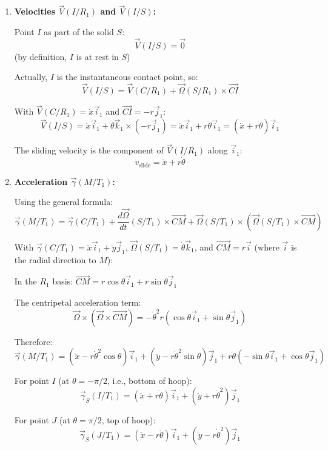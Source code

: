 \documentclass[12pt]{article}
\begin{document}
\begin{correctionbox}
\begin{enumerate}
    With $\overrightarrow{CI} = -r\vec{j}_1$ (from center to contact point):
    $$\vec{\Omega}(S/R_1) \times \overrightarrow{CI} = \dot{\theta}\vec{k}_1 \times (-r\vec{j}_1) = r\dot{\theta}\vec{i}_1$$
    
    For rolling without slipping: $\vec{V}(I/R_1) = \vec{0}$, giving $\dot{x} + r\dot{\theta} = 0$, so $\dot{x} = -r\dot{\theta}$.
    
    The sliding velocity is:
    $$v_{\text{slide}} = \dot{x}$$
    
    \item \textbf{Velocities $\vec{V}(I/R_1)$ and $\vec{V}(I/S)$:}
    
    Point $I$ as part of the solid $S$:
    $$\vec{V}(I/S) = \vec{0}$$ (by definition, $I$ is at rest in $S$)
    
    Actually, $I$ is the instantaneous contact point, so:
    $$\vec{V}(I/S) = \vec{V}(C/R_1) + \vec{\Omega}(S/R_1) \times \overrightarrow{CI}$$
    
    With $\vec{V}(C/R_1) = \dot{x}\vec{i}_1$ and $\overrightarrow{CI} = -r\vec{j}_1$:
    $$\vec{V}(I/S) = \dot{x}\vec{i}_1 + \dot{\theta}\vec{k}_1 \times (-r\vec{j}_1) = \dot{x}\vec{i}_1 + r\dot{\theta}\vec{i}_1 = (\dot{x} + r\dot{\theta})\vec{i}_1$$
    
    The sliding velocity is the component of $\vec{V}(I/R_1)$ along $\vec{i}_1$:
    $$v_{\text{slide}} = \dot{x} + r\dot{\theta}$$
    
    \item \textbf{Acceleration $\vec{\gamma}(M/T_1)$:}
    
    Using the general formula:
    $$\vec{\gamma}(M/T_1) = \vec{\gamma}(C/T_1) + \frac{d\vec{\Omega}}{dt}(S/T_1) \times \overrightarrow{CM} + \vec{\Omega}(S/T_1) \times (\vec{\Omega}(S/T_1) \times \overrightarrow{CM})$$
    
    With $\vec{\gamma}(C/T_1) = \ddot{x}\vec{i}_1 + \ddot{y}\vec{j}_1$, $\vec{\Omega}(S/T_1) = \dot{\theta}\vec{k}_1$, and $\overrightarrow{CM} = r\vec{i}$ (where $\vec{i}$ is the radial direction to $M$):
    
    In the $R_1$ basis: $\overrightarrow{CM} = r\cos\theta\vec{i}_1 + r\sin\theta\vec{j}_1$
    
    The centripetal acceleration term:
    $$\vec{\Omega} \times (\vec{\Omega} \times \overrightarrow{CM}) = -\dot{\theta}^2 r(\cos\theta\vec{i}_1 + \sin\theta\vec{j}_1)$$
    
    Therefore:
    $$\vec{\gamma}(M/T_1) = (\ddot{x} - r\dot{\theta}^2\cos\theta)\vec{i}_1 + (\ddot{y} - r\dot{\theta}^2\sin\theta)\vec{j}_1 + r\ddot{\theta}(-\sin\theta\vec{i}_1 + \cos\theta\vec{j}_1)$$
    
    For point $I$ (at $\theta = -\pi/2$, i.e., bottom of hoop):
    $$\vec{\gamma}_S(I/T_1) = (\ddot{x} + r\ddot{\theta})\vec{i}_1 + (\ddot{y} + r\dot{\theta}^2)\vec{j}_1$$
    
    For point $J$ (at $\theta = \pi/2$, top of hoop):
    $$\vec{\gamma}_S(J/T_1) = (\ddot{x} - r\ddot{\theta})\vec{i}_1 + (\ddot{y} - r\dot{\theta}^2)\vec{j}_1$$
\end{enumerate}
\end{correctionbox}
\end{document}
